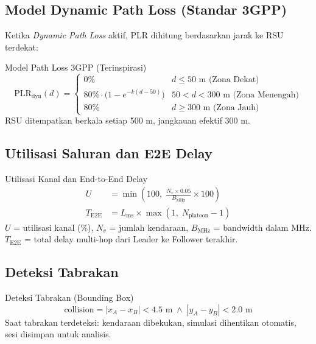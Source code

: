 \documentclass[12pt,a4paper]{article}
\begin{document}
\subsection{Model Dynamic Path Loss (Standar 3GPP)}

Ketika \textit{Dynamic Path Loss} aktif, PLR dihitung berdasarkan jarak ke RSU terdekat:

\begin{formulabox}{Model Path Loss 3GPP (Terinspirasi)}
\begin{equation}
  \text{PLR}_{\text{dyn}}(d) = \begin{cases}
    0\%   & d \leq 50\text{ m (Zona Dekat)} \\
    80\% \cdot \bigl(1 - e^{-k(d-50)}\bigr) & 50 < d < 300\text{ m (Zona Menengah)} \\
    80\%  & d \geq 300\text{ m (Zona Jauh)}
  \end{cases}
  \label{eq:path_loss}
\end{equation}
RSU ditempatkan berkala setiap 500 m, jangkauan efektif 300 m.
\end{formulabox}

\subsection{Utilisasi Saluran dan E2E Delay}

\begin{formulabox}{Utilisasi Kanal dan End-to-End Delay}
\begin{align}
  U &= \min\!\left(100,\;\frac{N_v \times 0.05}{B_{\text{MHz}}} \times 100\right) \label{eq:util}\\[6pt]
  T_{\text{E2E}} &= L_{\text{ms}} \times \max(1,\; N_{\text{platoon}} - 1) \label{eq:e2e}
\end{align}
$U$ = utilisasi kanal (\%), $N_v$ = jumlah kendaraan, $B_{\text{MHz}}$ = bandwidth dalam MHz.\\
$T_{\text{E2E}}$ = total delay multi-hop dari Leader ke Follower terakhir.
\end{formulabox}

\subsection{Deteksi Tabrakan}

\begin{formulabox}{Deteksi Tabrakan (Bounding Box)}
\begin{equation}
  \text{collision} = |x_A - x_B| < 4.5\text{ m} \;\wedge\; |y_A - y_B| < 2.0\text{ m}
  \label{eq:collision}
\end{equation}
Saat tabrakan terdeteksi: kendaraan dibekukan, simulasi dihentikan otomatis,
sesi disimpan untuk analisis.
\end{formulabox}
\end{document}
